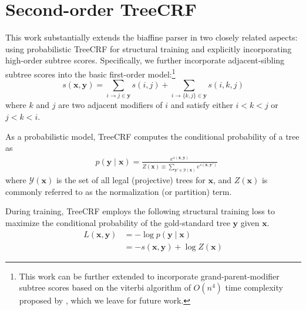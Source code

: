 \documentclass[11pt,a4paper]{article}
\begin{document}
\section{Second-order TreeCRF}
\label{2o-tree-crf}



This work substantially extends the biaffine parser in two closely related aspects:
using probabilistic TreeCRF for structural training and explicitly incorporating high-order subtree scores.
Specifically, we further incorporate adjacent-sibling subtree scores into the basic first-order model:\footnote{
  This work can be further extended to incorporate
  grand-parent-modifier subtree scores
based on the viterbi algorithm of $O(n^4)$ time complexity proposed by \citet{koo-collins-2010-efficient}, which
we leave for future work.
}
\begin{equation}\label{eq:score-definition-2o}
s(\boldsymbol{x}, \boldsymbol{y}) = \sum_{i\rightarrow j \in \boldsymbol{y}}s(i,j) + \sum_{
i\rightarrow \{k,j\} \in \boldsymbol{y} } s(i,k,j)
\end{equation}
where $k$ and $j$ are two adjacent modifiers of $i$ and satisfy either $i < k < j$ or $j < k < i$.


As a probabilistic model, TreeCRF computes the conditional probability of a tree as
\begin{equation}\label{equation:prob-labeled}
\begin{split}
& p(\boldsymbol{y}\mid\boldsymbol{x})  = \frac{e^{s(\boldsymbol{x},\boldsymbol{y})}}{Z(\boldsymbol{x}) \equiv \sum_{\boldsymbol{y'} \in \mathcal{Y}(\boldsymbol{x})} {e^{s(\boldsymbol{x},\boldsymbol{y'})}}}
\end{split}
\end{equation}
where $\mathcal{Y}(\boldsymbol{x})$ is the set of all legal (projective) trees for $\boldsymbol{x}$, and
$Z(\boldsymbol{x})$ is commonly referred to as the normalization (or partition) term.

During training, TreeCRF employs the following structural training loss to
maximize the conditional probability of the gold-standard tree $\boldsymbol{y}$ given $\boldsymbol{x}$.
\begin{equation}\label{equation:training-loss-treecrf}
\begin{split}
\mathit{L}(\boldsymbol{x},\boldsymbol{y}) &= -\log p(\boldsymbol{y}\mid\boldsymbol{x})  \\
&= - s(\boldsymbol{x}, \boldsymbol{y}) + \log Z(\boldsymbol{x})
\end{split}
\end{equation}
\end{document}
